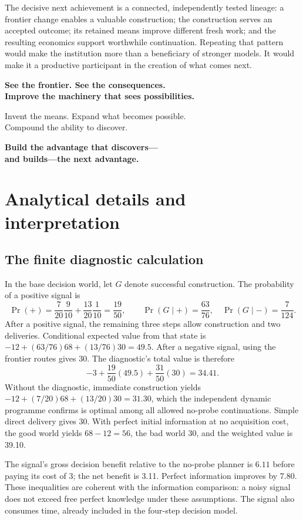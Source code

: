 \documentclass[11pt,letterpaper]{article}
\theoremstyle{remark}\newtheorem{remark}{Remark}[section]
\begin{document}
The decisive next achievement is a connected, independently tested lineage: a frontier change enables a valuable construction; the construction serves an accepted outcome; its retained means improve different fresh work; and the resulting economics support worthwhile continuation. Repeating that pattern would make the institution more than a beneficiary of stronger models. It would make it a productive participant in the creation of what comes next.

\begin{thesisbox}
\centering
{\large\bfseries See the frontier. See the consequences.\\Improve the machinery that sees possibilities.}\par\medskip
Invent the means. Expand what becomes possible.\\Compound the ability to discover.\par\medskip
{\large\bfseries\color{Violet}Build the advantage that discovers---\\and builds---the next advantage.}
\end{thesisbox}

\clearpage
\appendix
\section{Analytical details and interpretation}
\subsection{The finite diagnostic calculation}
In the base decision world, let $G$ denote successful construction. The probability of a positive signal is
\[
\Pr(+)=\frac{7}{20}\frac9{10}+\frac{13}{20}\frac1{10}=\frac{19}{50},
\qquad
\Pr(G\mid +)=\frac{63}{76},\quad \Pr(G\mid -)=\frac7{124}.
\]
After a positive signal, the remaining three steps allow construction and two deliveries. Conditional expected value from that state is $-12+(63/76)68+(13/76)30=49.5$. After a negative signal, using the frontier routes gives 30. The diagnostic's total value is therefore
\[
-3+\frac{19}{50}(49.5)+\frac{31}{50}(30)=34.41.
\]
Without the diagnostic, immediate construction yields $-12+(7/20)68+(13/20)30=31.30$, which the independent dynamic programme confirms is optimal among all allowed no-probe continuations. Simple direct delivery gives 30. With perfect initial information at no acquisition cost, the good world yields $68-12=56$, the bad world 30, and the weighted value is 39.10.

The signal's gross decision benefit relative to the no-probe planner is $6.11$ before paying its cost of 3; the net benefit is 3.11. Perfect information improves by 7.80. These inequalities are coherent with the information comparison: a noisy signal does not exceed free perfect knowledge under these assumptions. The signal also consumes time, already included in the four-step decision model.
\end{document}
